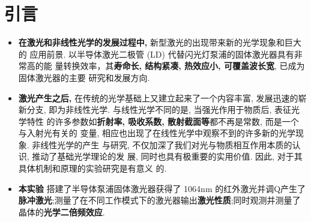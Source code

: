 \documentclass[a4paper]{article}
\begin{document}
\section{引言} \label{overview}%
 
\begin{itemize}
	\item{\textbf{在激光和非线性光学的发展过程中,} 新型激光的出现带来新的光学现象和巨大的
应用前景. 以半导体激光二极管 (LD) 代替闪光灯泵浦的固体激光器具有非常高的能
量转换效率，其{\bf{寿命长, 结构紧凑, 热效应小, 可覆盖波长宽}}, 已成为固体激光器的主要
研究和发展方向.}
    \item{\textbf{激光产生之后,} 在传统的光学基础上又建立起来了一个内容丰富, 发展迅速的崭
新分支, 即为非线性光学. 与线性光学不同的是, 当强光作用于物质后, 表征光学特性
的许多参数如{\bf{折射率, 吸收系数, 散射截面等}}都不再是常数, 而是一个与入射光有关的
变量, 相应也出现了在线性光学中观察不到的许多新的光学现象. 非线性光学的产生
与研究, 不仅加深了我们对光与物质相互作用本质的认识, 推动了基础光学理论的发
展, 同时也具有极重要的实用价值. 因此, 对于其具体机制和原理的实验研究是有意义
的.}
    \item{\textbf{本实验} 搭建了半导体泵浦固体激光器获得了 1064nm 的红外激光并调Q产生了{\bf{脉冲激光}};测量了在不同工作模式下的激光器输出{\bf{激光性质}};同时观测并测量了晶体的{\bf{光学二倍频效应}}.}
\end{itemize}

\newpage
\end{document}
